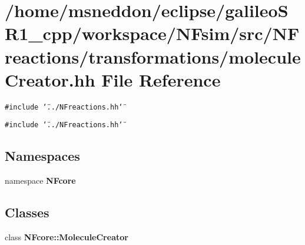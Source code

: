 \section{/home/msneddon/eclipse/galileoSR1\_\-cpp/workspace/NFsim/src/NFreactions/transformations/moleculeCreator.hh File Reference}
\label{moleculeCreator_8hh}


{\tt \#include \char`\"{}../NFreactions.hh\char`\"{}}\par
{\tt \#include \char`\"{}../NFreactions.hh\char`\"{}}\par
\subsection*{Namespaces}
\begin{CompactItemize}
\item 
namespace {\bf NFcore}
\end{CompactItemize}
\subsection*{Classes}
\begin{CompactItemize}
\item 
class {\bf NFcore::MoleculeCreator}
\end{CompactItemize}
